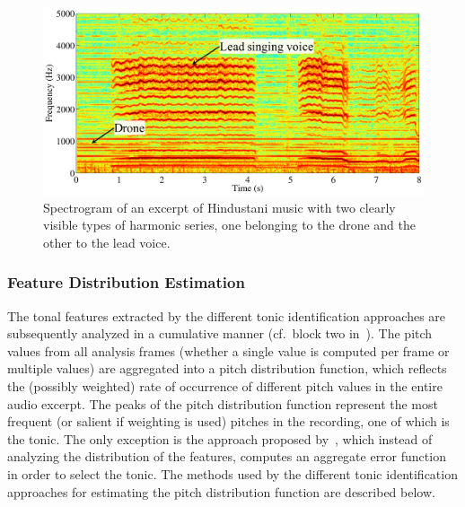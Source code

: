 \begin{figure}
	\begin{center}
		\includegraphics[width=\figSizeNinety]{ch02_background/figures/2HarmonicSeries.pdf}
	\end{center}
	\caption[Spectrogram of an excerpt of Hindustani music]{Spectrogram of an excerpt of Hindustani music with two clearly visible types of harmonic series, one belonging to the drone and the other to the lead voice.}
	\label{fig:2HarmonicSeries}
\end{figure}


\subsubsection{Feature Distribution Estimation}
\label{sec:background_tonic_feature_distribution_estimation}

The tonal features extracted by the different tonic identification approaches are subsequently analyzed in a cumulative manner (cf.~block two in~). The pitch values from all analysis frames (whether a single value is computed per frame or multiple values) are aggregated into a pitch distribution function, which reflects the (possibly weighted) rate of occurrence of different pitch values in the entire audio excerpt. The peaks of the pitch distribution function represent the most frequent (or salient if weighting is used) pitches in the recording, one of which is the tonic. The only exception is the approach proposed by~\cite{Sengupta2005b}, which instead of analyzing the distribution of the features, computes an aggregate error function in order to select the tonic. The methods used by the different tonic identification approaches for estimating the pitch distribution function are described below.

